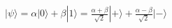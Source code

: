 \documentclass[preview]{standalone}
\begin{document}
\begin{align*}
|\psi\rangle = \alpha|0\rangle + \beta|1\rangle = \frac{\alpha + \beta}{\sqrt{2}} |+\rangle + \frac{\alpha - \beta}{\sqrt{2}} |-\rangle
\end{align*}
\end{document}

